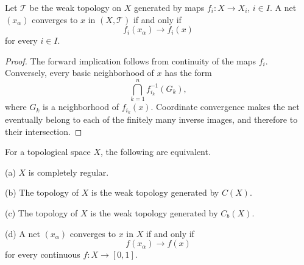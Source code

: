 \begin{lem}
Let $\mathcal{T}$ be the weak topology on $X$ generated by maps
$f_i:X\to X_i$, $i\in I$. A net $(x_\alpha)$ converges to $x$ in
$(X,\mathcal{T})$ if and only if
\[
f_i(x_\alpha)\longrightarrow f_i(x)
\]
for every $i\in I$.
\end{lem}

\begin{proof}
The forward implication follows from continuity of the maps $f_i$. Conversely,
every basic neighborhood of $x$ has the form
\[
\bigcap_{k=1}^n f_{i_k}^{-1}(G_k),
\]
where $G_k$ is a neighborhood of $f_{i_k}(x)$. Coordinate convergence makes
the net eventually belong to each of the finitely many inverse images, and
therefore to their intersection.
\end{proof}

\begin{thm}
For a topological space $X$, the following are equivalent.

(a) $X$ is completely regular.

(b) The topology of $X$ is the weak topology generated by $C(X)$.

(c) The topology of $X$ is the weak topology generated by $C_b(X)$.

(d) A net $(x_\alpha)$ converges to $x$ in $X$ if and only if
\[
f(x_\alpha)\longrightarrow f(x)
\]
for every continuous $f:X\to[0,1]$.
\end{thm}

